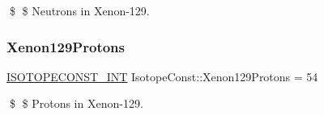 \$ \$ Neutrons in Xenon-\/129. \mbox{\label{group___isotope_const-_xenon-_xe129_gadc3c7f7d38d180fde0e87f759120aaee}} 
\subsubsection{\texorpdfstring{Xenon129\+Protons}{Xenon129Protons}}
{\footnotesize\ttfamily \mbox{\hyperlink{group___isotope_const-_macros_ga5f18360b3e99483a35c32d789e62621c}{I\+S\+O\+T\+O\+P\+E\+C\+O\+N\+S\+T\+\_\+\+I\+NT}} Isotope\+Const\+::\+Xenon129\+Protons = 54}

\$ \$ Protons in Xenon-\/129. 